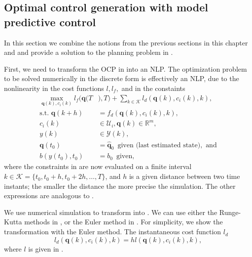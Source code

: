\subsection{Optimal control generation with model predictive control}
\label{sec:opt-cont-gener}

In this section we combine the notions from the previous sections in this chapter and  and provide a solution to the planning problem in .

First, we need to transform the OCP in  into an NLP. The optimization problem to be solved numerically in the discrete form is effectively an NLP, due to the nonlinearity in the cost functions $l,l_f,$ and in the constaints
\begin{subequations}\label{eq:disc-ocp-output-mpc}\begin{align}
  \max_{\mathbf{q}(k),c_i(k)}{l_f(\mathbf{q}(T}&{),T)+\sum_{k\in\mathcal{K}}{l_d(\mathbf{q}(k),c_i(k),k)}},\\
  \text{s.t. }\mathbf{q}(k+h)&=f_d(\mathbf{q}(k),c_i(k),k),\label{eq:disc-dyn-evol}\\
  c_i(k)&\in\mathcal{U}_i,\mathbf{q}(k)\in\mathbb{R}^m,\label{eq:disc-state-cont-const-mpc}\\
  y(k)&\in\mathcal{Y}(k),\label{eq:disc-batt-const-mpc}\\
  \mathbf{q}(t_0)&=\hat{\mathbf{q}}_0\,\,\,\text{given (last estimated state)},\text{ and}\\
  b(y(t_0),t_0)&=b_0\,\,\,\text{given},
\end{align}\end{subequations}
where the constraints in  are now evaluated on a finite interval $k\in\mathcal{K}=\{t_0,t_0+h,t_0+2h,\dots,T\}$, and $h$ is a given distance between two time instants; the smaller the distance the more precise the simulation. The other expressions are analogous to .

We use numerical simulation to transform  into . We can use either the Runge-Kutta methods in , or the Euler method in . For simplicity, we show the transformation with the Euler method. The instantaneous cost function $l_d$
\begin{equation}
  l_d(\mathbf{q}(k),c_i(k),k)=hl(\mathbf{q}(k),c_i(k),k),
\end{equation}
where $l$ is given in .

